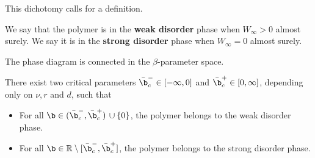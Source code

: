 This dichotomy calls for a definition.

\begin{definition} We say that the polymer is in the \textbf{weak disorder} phase when $W_\infty > 0$ almost surely. We say it is in the \textbf{strong disorder} phase when $W_\infty = 0$ almost surely.
\end{definition}

The phase diagram is connected in the $\beta$-parameter space. 

\begin{theorem}\label{th:313} There exist two critical parameters ${\bar{\b}_c}^- \in [-\infty,0]$ and ${\bar{\b}_c}^+ \in [0,\infty]$, depending only on $\nu,r$ and $d$, such that
\begin{itemize}
\item For all $\b \in ({\bar{\b}_c}^-,{\bar{\b}_c}^+) \,\cup \{0\}$, the polymer belongs to the weak disorder phase.
\item For all $\b \in \mathbb{R}\setminus [{\bar{\b}_c}^-,{\bar{\b}_c}^+]$, the polymer belongs to the strong disorder phase.
\end{itemize}
\end{theorem}
